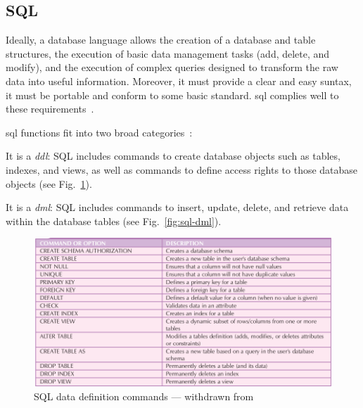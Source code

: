 \subsection{SQL}
\label{sec:sql}
Ideally, a database language allows the creation of a database and table
structures, the execution of basic data management tasks (add, delete, and
modify), and the execution of complex queries designed to transform the raw data
into useful information. Moreover, it must provide a clear and easy suntax, it
must be portable and conform to some basic standard. \gls{sql} complies well to
these requirements~\cite{coronel2016database}.

\gls{sql} functions fit into two broad categories~\cite{coronel2016database}:
\begin{enum-c}
\item It is a \emph{\gls{ddl}}: SQL includes commands to create database objects
  such as tables, indexes, and views, as well as commands to define access
  rights to those database objects (see Fig.~\ref{fig:sql-dll}).
\item It is a \emph{\gls{dml}}: SQL includes commands to insert, update, delete,
  and retrieve data within the database tables (see Fig.~\ref{fig:sql-dml}).
\end{enum-c}
%
\begin{figure}[htb!]
\centering
    \includegraphics[width=0.9\columnwidth]{./img/sql-dll.png}
  \caption{SQL data definition commands --- withdrawn from~\cite{coronel2016database}}%
  \label{fig:sql-dll}
\end{figure}
%
